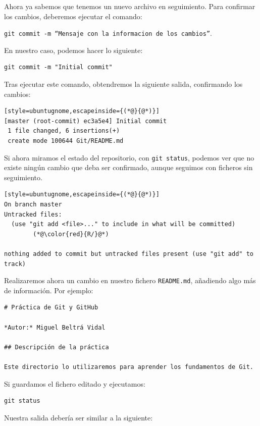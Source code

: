 \documentclass[11pt,a4paper]{article}
\theoremstyle{exercise}
\begin{document}
Ahora ya sabemos que tenemos un nuevo archivo en seguimiento. Para confirmar los cambios, deberemos ejecutar el comando:
\begin{center}
\texttt{git commit -m ``Mensaje con la informacion de los cambios''}. 
\end{center}
En nuestro caso, podemos hacer lo siguiente:
\begin{lstlisting}[style=ubuntugnome]
git commit -m "Initial commit"
\end{lstlisting}
Tras ejecutar este comando, obtendremos la siguiente salida, confirmando los cambios:
\begin{lstlisting}[style=ubuntugnome,escapeinside={(*@}{@*)}]
[master (root-commit) ec3a5e4] Initial commit
 1 file changed, 6 insertions(+)
 create mode 100644 Git/README.md
\end{lstlisting}
Si ahora miramos el estado del repositorio, con \texttt{git status}, podemos ver que no existe ningún cambio que deba ser confirmado, aunque seguimos con ficheros sin seguimiento.
\begin{lstlisting}[style=ubuntugnome,escapeinside={(*@}{@*)}]
On branch master
Untracked files:
  (use "git add <file>..." to include in what will be committed)
        (*@\color{red}{R/}@*)

nothing added to commit but untracked files present (use "git add" to track)
\end{lstlisting}
Realizaremos ahora un cambio en nuestro fichero \texttt{README.md}, añadiendo algo más de información. Por ejemplo:
\begin{lstlisting}[style=mdstyle]
# Práctica de Git y GitHub

*Autor:* Miguel Beltrá Vidal

## Descripción de la práctica

Este directorio lo utilizaremos para aprender los fundamentos de Git.
\end{lstlisting}

\noindent Si guardamos el fichero editado y ejecutamos: \begin{lstlisting}[style=ubuntugnome]
git status
\end{lstlisting}

\noindent Nuestra salida debería ser similar a la siguiente:
\end{document}
